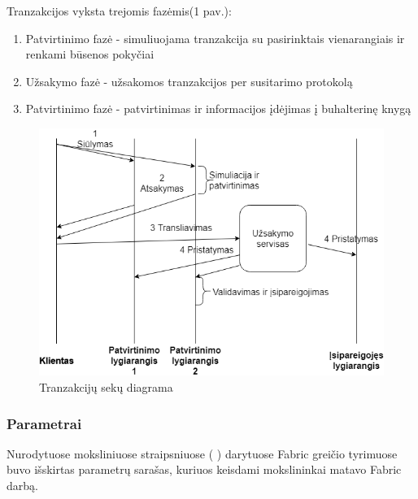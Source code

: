 \documentclass{VUMIFPSkursinis}
\begin{document}
			Tranzakcijos vyksta trejomis fazėmis(1 pav.):
			\begin{enumerate}
				\item{Patvirtinimo fazė - simuliuojama tranzakcija su pasirinktais vienarangiais ir renkami būsenos pokyčiai}
				\item{Užsakymo fazė - užsakomos tranzakcijos per susitarimo protokolą}
				\item{Patvirtinimo fazė - patvirtinimas ir informacijos įdėjimas į buhalterinę knygą }
			\end{enumerate}

\begin{figure}[H]
    \centering
    \includegraphics[scale=0.5]{img/MLP}
    \caption{Tranzakcijų sekų diagrama}   %
    \label{img:mlp}
\end{figure}



				
		\subsubsection{Parametrai}

		Nurodytuose moksliniuose straipsniuose (\cite{ThailandPerf} \cite{IMBResearch}) darytuose Fabric greičio tyrimuose
		buvo išskirtas parametrų sarašas, kuriuos keisdami mokslininkai matavo Fabric darbą. 
			
\end{document}
